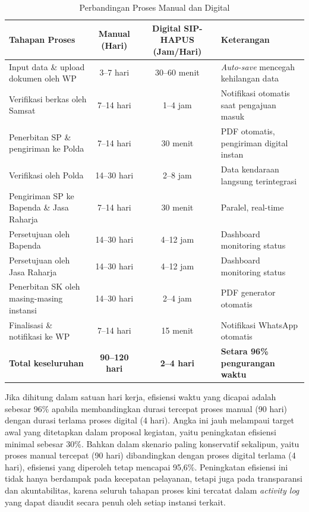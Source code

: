 \documentclass[conference]{IEEEtran}
\begin{document}
\begin{table}[!t]
\centering
\caption{Perbandingan Proses Manual dan Digital}
\label{tab:perbandingan}
\renewcommand{\arraystretch}{1.3}
\begin{tabular}{|l|c|c|l|}
\hline
\textbf{Tahapan Proses} & \textbf{Manual (Hari)} & \textbf{Digital SIP-HAPUS (Jam/Hari)} & \textbf{Keterangan} \\
\hline
Input data \& upload dokumen oleh WP & 3--7 hari & 30--60 menit & \emph{Auto-save} mencegah kehilangan data \\
Verifikasi berkas oleh Samsat & 7--14 hari & 1--4 jam & Notifikasi otomatis saat pengajuan masuk \\
Penerbitan SP \& pengiriman ke Polda & 7--14 hari & 30 menit & PDF otomatis, pengiriman digital instan \\
Verifikasi oleh Polda & 14--30 hari & 2--8 jam & Data kendaraan langsung terintegrasi \\
Pengiriman SP ke Bapenda \& Jasa Raharja & 7--14 hari & 30 menit & Paralel, real-time \\
Persetujuan oleh Bapenda & 14--30 hari & 4--12 jam & Dashboard monitoring status \\
Persetujuan oleh Jasa Raharja & 14--30 hari & 4--12 jam & Dashboard monitoring status \\
Penerbitan SK oleh masing-masing instansi & 14--30 hari & 2--4 jam & PDF generator otomatis \\
Finalisasi \& notifikasi ke WP & 7--14 hari & 15 menit & Notifikasi WhatsApp otomatis \\
\hline
\textbf{Total keseluruhan} & \textbf{90--120 hari} & \textbf{2--4 hari} & \textbf{Setara 96\% pengurangan waktu} \\
\hline
\end{tabular}
\end{table}

Jika dihitung dalam satuan hari kerja, efisiensi waktu yang dicapai adalah sebesar 96\%
apabila membandingkan durasi tercepat proses manual (90 hari) dengan durasi terlama proses
digital (4 hari). Angka ini jauh melampaui target awal yang ditetapkan dalam proposal
kegiatan, yaitu peningkatan efisiensi minimal sebesar 30\%. Bahkan dalam skenario paling
konservatif sekalipun, yaitu proses manual tercepat (90 hari) dibandingkan dengan proses
digital terlama (4 hari), efisiensi yang diperoleh tetap mencapai 95,6\%. Peningkatan
efisiensi ini tidak hanya berdampak pada kecepatan pelayanan, tetapi juga pada transparansi
dan akuntabilitas, karena seluruh tahapan proses kini tercatat dalam \emph{activity log}
yang dapat diaudit secara penuh oleh setiap instansi terkait.
\end{document}
